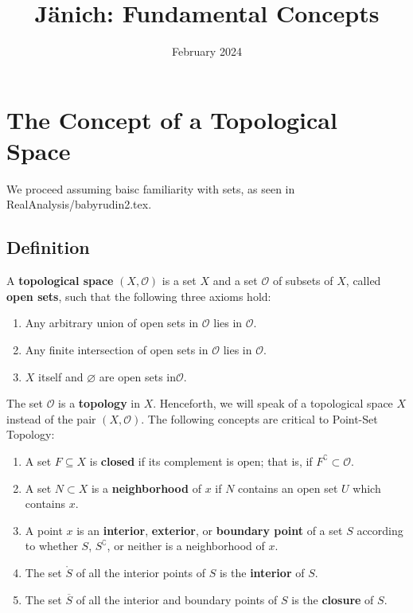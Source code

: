 \documentclass[11pt]{article}
\title{Jänich: Fundamental Concepts}
\author{February 2024}
\renewcommand{\O}{\mathcal{O}}
\begin{document}
\maketitle
\tableofcontents
\newpage


\section{The Concept of a Topological Space}

We proceed assuming baisc familiarity with sets, as seen in RealAnalysis/babyrudin2.tex.


\subsection{Definition}

A \textbf{topological space} $(X, \O)$ is a set $X$ and a set $\O$ of subsets of $X$, called \textbf{open sets}, such that the following three axioms hold:
\begin{enumerate}
  \item Any arbitrary union of open sets in $\O$ lies in $\O$.
  \item Any finite intersection of open sets in $\O$ lies in $\O$.
  \item $X$ itself and $\varnothing$ are open sets in$\O$.
\end{enumerate}
The set $\O$ is a \textbf{topology} in $X$. Henceforth, we will speak of a topological space $X$ instead of the pair $(X, \O)$. The following concepts are critical to Point-Set Topology:
\begin{enumerate}
  \item A set $F \subseteq X$ is \textbf{closed} if its complement is open; that is, if $F^{\complement} \subset \O$.
  \item A set $N \subset X$ is a \textbf{neighborhood} of $x$ if $N$ contains an open set $U$ which contains $x$.
  \item A point $x$ is an \textbf{interior}, \textbf{exterior}, or \textbf{boundary point} of a set $S$ according to whether $S$, $S^{\complement}$, or neither is a neighborhood of $x$.
  \item The set $\mathring{S}$ of all the interior points of $S$ is the \textbf{interior} of $S$.
  \item The set $\overline{S}$ of all the interior and boundary points of $S$ is the \textbf{closure} of $S$.
\end{enumerate}
\end{document}
